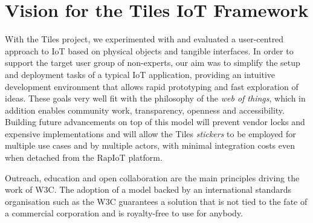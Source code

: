 \section{Vision for the Tiles IoT Framework}

With the Tiles project, we experimented with and evaluated a user-centred approach to IoT based on physical objects and tangible interfaces. In order to support the target user group of non-experts, our aim was to simplify the setup and deployment tasks of a typical IoT application, providing an intuitive development environment that allows rapid prototyping and fast exploration of ideas. These goals very well fit with the philosophy of the \textit{web of things}, which in addition enables community work, transparency, openness and accessibility. Building future advancements on top of this model will prevent vendor locks and expensive implementations and will allow the Tiles \textit{stickers} to be employed for multiple use cases and by multiple actors, with minimal integration costs even when detached from the RapIoT platform.

Outreach, education and open collaboration are the main principles driving the work of W3C. The adoption of a model backed by an international standards organisation such as the W3C guarantees a solution that is not tied to the fate of a commercial corporation and is royalty-free to use for anybody.